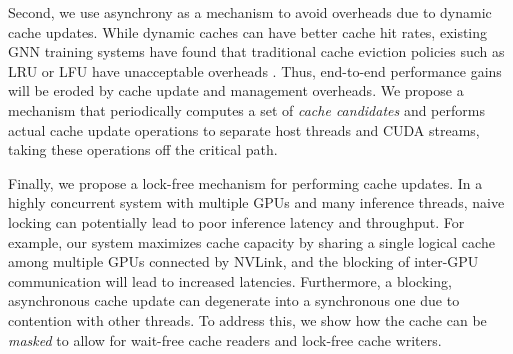 Second, we use asynchrony as a mechanism to avoid overheads due to dynamic cache updates. While dynamic caches can have better cache hit rates, existing GNN training systems have found that traditional cache eviction policies such as LRU or LFU have unacceptable overheads \cite{PaGraph_2020} \cite{GNNLab_2022}. Thus, end-to-end performance gains will be eroded by cache update and management overheads. We propose a mechanism that periodically computes a set of \textit{cache candidates} and performs actual cache update operations to separate host threads and CUDA streams, taking these operations off the critical path.

Finally, we propose a lock-free mechanism for performing cache updates. In a highly concurrent system with multiple GPUs and many inference threads, naive locking can potentially lead to poor inference latency and throughput. For example, our system maximizes cache capacity by sharing a single logical cache among multiple GPUs connected by NVLink, and the blocking of inter-GPU communication will lead to increased latencies. Furthermore, a blocking, asynchronous cache update can degenerate into a synchronous one due to contention with other threads. To address this, we show how the cache can be \textit{masked} to allow for wait-free cache readers and lock-free cache writers.


